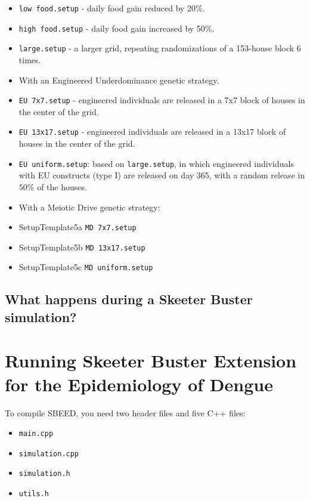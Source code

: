 \documentclass[11pt]{article}
\newcommand{\linecmd}[1]{\texttt{#1}}
\begin{document}
\begin{itemize}
	\item \linecmd{low food.setup} - daily food gain reduced by 20\%.
	\item \linecmd{high food.setup} - daily food gain increased by 50\%.
	\item \linecmd{large.setup} - a larger grid, repeating randomizations of a 153-house block 6 times.
	\item[] With an Engineered Underdominance genetic strategy.
	\item \linecmd{EU 7x7.setup} - engineered individuals are released in a 7x7 block of houses in the center of the grid.
	\item \linecmd{EU 13x17.setup} - engineered individuals are released in a 13x17 block of houses in the center of the grid.
	\item \linecmd{EU uniform.setup}: based on \linecmd{large.setup}, in which engineered individuals with EU constructs (type I) are released on day 365, with a random release in $50\%$ of the houses.
	\item[] With a Meiotic Drive genetic strategy:
	\item SetupTemplate5a \linecmd{MD 7x7.setup}
	\item SetupTemplate5b \linecmd{MD 13x17.setup}
	\item SetupTemplate5c \linecmd{MD uniform.setup}
\end{itemize}

\subsection{What happens during a Skeeter Buster simulation?}

\newpage{}

\section{Running Skeeter Buster Extension for the Epidemiology of Dengue}

To compile SBEED, you need two header files and five C++ files:
\begin{itemize}
	\item \linecmd{main.cpp}
	\item \linecmd{simulation.cpp}
	\item \linecmd{simulation.h}
	\item \linecmd{utils.h}
\end{itemize}
\end{document}
